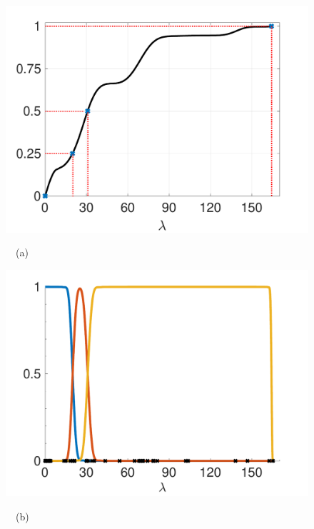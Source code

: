 \documentclass[journal, 10pt]{IEEEtran}
\begin{document}
\begin{figure}[tb]
\begin{minipage}[m]{0.49\linewidth}
\centerline{\includegraphics[width=1.1\linewidth]{fig_cdf}}
\centerline{~~\small{(a)}}
\end{minipage}
\begin{minipage}[m]{0.49\linewidth}
\centerline{\includegraphics[width=1.1\linewidth]{fig_orig_fb}}
\centerline{~~\small{(b)}}
\end{minipage} \\
\begin{minipage}[m]{0.49\linewidth}

\end{minipage}
\end{figure}
\end{document}
